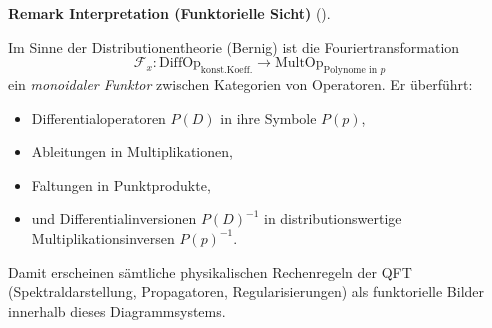 \documentclass[10pt, letterpaper]{article}
\newcommand{\CustomHeading}[3]{%
  \par\medskip\noindent%
  \textbf{#1 #2} \textnormal{(#3)}.\enskip%
}
\newenvironment{REM}[2]{\begin{unitbox}\CustomHeading{Remark}{#1}{#2}}{\end{unitbox}}
\begin{document}


\begin{REM}{Interpretation (Funktorielle Sicht)}{}
Im Sinne der Distributionentheorie (Bernig) ist die Fouriertransformation
\[
\mathcal{F}_x:\text{DiffOp}_{\text{konst.Koeff.}}\longrightarrow \text{MultOp}_{\text{Polynome in }p}
\]
ein \emph{monoidaler Funktor} zwischen Kategorien von Operatoren.
Er überführt:
\begin{itemize}
\item Differentialoperatoren $P(D)$ in ihre Symbole $P(p)$,
\item Ableitungen in Multiplikationen,
\item Faltungen in Punktprodukte,
\item und Differentialinversionen $P(D)^{-1}$ in distributionswertige Multiplikationsinversen $P(p)^{-1}$.
\end{itemize}
Damit erscheinen sämtliche physikalischen Rechenregeln der QFT
(Spektraldarstellung, Propagatoren, Regularisierungen)
als funktorielle Bilder innerhalb dieses Diagrammsystems.
\end{REM}

\end{document}
